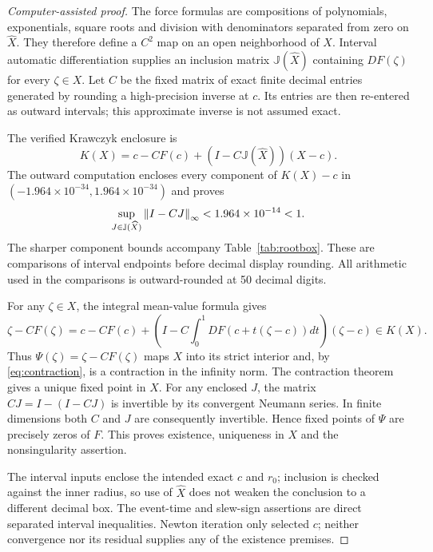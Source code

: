 \begin{proof}[Computer-assisted proof]
The force formulas are compositions of polynomials, exponentials, square roots and division with denominators separated from zero on $\widehat X$. They therefore define a $C^2$ map on an open neighborhood of $X$. Interval automatic differentiation supplies an inclusion matrix $\mathbb J(\widehat X)$ containing $DF(\zeta)$ for every $\zeta\in X$. Let $C$ be the fixed matrix of exact finite decimal entries generated by rounding a high-precision inverse at $c$. Its entries are then re-entered as outward intervals; this approximate inverse is not assumed exact.

The verified Krawczyk enclosure is
\begin{equation}\label{eq:krawczyk}
 K(X)=c-CF(c)+(I-C\mathbb J(\widehat X))(X-c).
\end{equation}
The outward computation encloses every component of $K(X)-c$ in $(-1.964\times10^{-34},1.964\times10^{-34})$ and proves
\begin{equation}\label{eq:contraction}
 \sup_{J\in\mathbb J(\widehat X)}\left\lVert I-CJ\right\rVert_{\infty}<1.964\times10^{-14}<1.
\end{equation}
The sharper component bounds accompany Table~\ref{tab:rootbox}. These are comparisons of interval endpoints before decimal display rounding. All arithmetic used in the comparisons is outward-rounded at 50 decimal digits.

For any $\zeta\in X$, the integral mean-value formula gives
\[
 \zeta-CF(\zeta)=c-CF(c)+\left(I-C\int_0^1DF(c+t(\zeta-c))dt\right)(\zeta-c)\in K(X).
\]
Thus $\Psi(\zeta)=\zeta-CF(\zeta)$ maps $X$ into its strict interior and, by \eqref{eq:contraction}, is a contraction in the infinity norm. The contraction theorem gives a unique fixed point in $X$. For any enclosed $J$, the matrix $CJ=I-(I-CJ)$ is invertible by its convergent Neumann series. In finite dimensions both $C$ and $J$ are consequently invertible. Hence fixed points of $\Psi$ are precisely zeros of $F$. This proves existence, uniqueness in $X$ and the nonsingularity assertion.

The interval inputs enclose the intended exact $c$ and $r_0$; inclusion is checked against the inner radius, so use of $\widehat X$ does not weaken the conclusion to a different decimal box. The event-time and slew-sign assertions are direct separated interval inequalities. Newton iteration only selected $c$; neither convergence nor its residual supplies any of the existence premises.
\end{proof}

